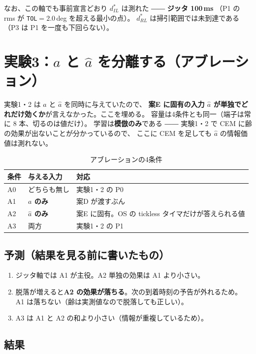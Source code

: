 \documentclass[11pt,a4paper]{article}
\newcommand{\code}[1]{\texttt{#1}}
\newcommand{\keyp}[1]{\textbf{\textcolor{blue!45!black}{#1}}}
\begin{document}
\noindent
なお、この軸でも事前宣言どおり $d^{*}_{IL}$ は測れた ―― \keyp{ジッタ 100\,ms}
（P1 の rms が \code{TOL}$=2.0$\,deg を超える最小の点）。
$d^{*}_{RL}$ は掃引範囲では未到達である（P3 は P1 を一度も下回らない）。

\section{実験3：$a$ と $\hat a$ を分離する（アブレーション）}
\label{sec:e3}

実験1・2 は $a$ と $\hat a$ を同時に与えていたので、
\keyp{案E に固有の入力 $\hat a$ が単独でどれだけ効くか}が言えなかった。ここを埋める。
容量は4条件とも同一（端子は常に 8 本、切るのは値だけ）。
学習は\keyp{模倣のみ}である ―― 実験1・2 で CEM に齢の効果が出ないことが分かっているので、
ここに CEM を足しても $\hat a$ の情報価値は測れない。

\begin{table}[htbp]
\centering
\small
\caption{アブレーションの4条件}
\begin{tabular}{@{}l l l@{}}
\toprule
\textbf{条件} & \textbf{与える入力} & \textbf{対応} \\
\midrule
A0 & どちらも無し & 実験1・2 の P0 \\
A1 & \keyp{$a$ のみ} & 案D が渡すぶん \\
A2 & \keyp{$\hat a$ のみ} & 案E に固有。OS の tickless タイマだけが答えられる値 \\
A3 & 両方 & 実験1・2 の P1 \\
\bottomrule
\end{tabular}
\end{table}

\subsection{予測（結果を見る前に書いたもの）}

\begin{enumerate}[leftmargin=1.8em,itemsep=2pt]
  \item ジッタ軸では A1 が主役。A2 単独の効果は A1 より小さい。
  \item 脱落が増えると\keyp{A2 の効果が落ちる}。次の到着時刻の予告が外れるため。
        A1 は落ちない（齢は実測値なので脱落しても正しい）。
  \item A3 は A1 と A2 の和より小さい（情報が重複しているため）。
\end{enumerate}

\subsection{結果}
\end{document}
